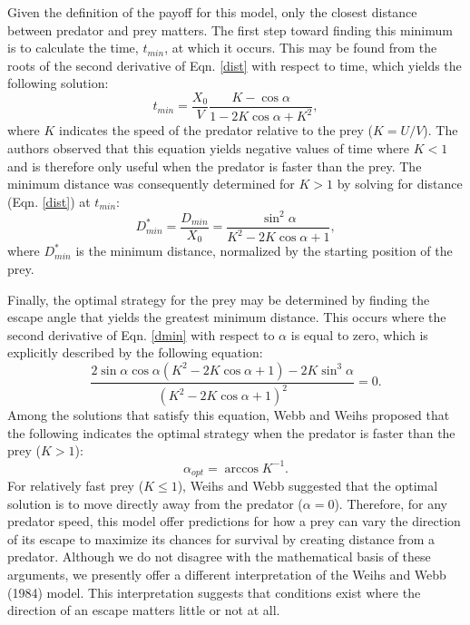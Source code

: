\documentclass[12pt]{article}
\begin{document}
Given the definition of the payoff for this model, only the closest distance between predator and prey matters. The first step toward finding this minimum is to calculate the time, $t_{min}$,  at which it occurs. This may be found from the roots of the second derivative of Eqn. \ref{dist} with respect to time, which yields the following solution:
%
\begin{equation}
t_{min} = \frac{X_0}{V} \frac{K-\cos\alpha}{1-2 K\cos\alpha+K^2},
\label{eq33weihs}	
\end{equation}
%
where $K$ indicates the speed of the predator relative to the prey ($K = U/V$). The authors observed that this equation yields negative values of time where $K<1$ and is therefore only useful when the predator is faster than the prey. The minimum distance was consequently determined for $K>1$ by solving for distance (Eqn. \ref{dist}) at $t_{min}$:
%
\begin{equation}
D_{min}^* = \frac{D_{min}}{X_0} = \frac{\sin^2\alpha}{K^2 - 2K \cos\alpha + 1},
\label{dmin}
\end{equation}
where $D_{min}^*$ is the minimum distance, normalized by the starting position of the prey.

Finally, the optimal strategy for the prey may be determined by finding the escape angle that yields the greatest minimum distance. This occurs where the second derivative of Eqn. \ref{dmin} with respect to $\alpha$ is equal to zero, which is explicitly described by the following equation:
%
\begin{equation}
\frac{2\sin\alpha \cos\alpha (K^2 -2 K \cos\alpha+1)-2 K \sin^3\alpha}{(K^2-2 K \cos\alpha + 1)^2} = 0. 
\label{eq37weihs}
\end{equation}
%
Among the solutions that satisfy this equation, Webb and Weihs proposed that the following indicates the optimal strategy when the predator is faster than the prey ($K>1$):
%
\begin{equation}
\alpha_{opt} = \arccos K^{-1}. 
\label{K>1}
\end{equation}
%
For relatively fast prey ($K\leq1$), Weihs and Webb suggested that the optimal solution is to move directly away from the predator ($\alpha = 0$). Therefore, for any predator speed, this model offer predictions for how a prey can vary the direction of its escape to maximize its chances for survival by creating distance from a predator. Although we do not disagree with the mathematical basis of these arguments, we presently offer a different interpretation of the Weihs and Webb (1984) model. This interpretation suggests that conditions exist where the direction of an escape matters little or not at all.
\end{document}
